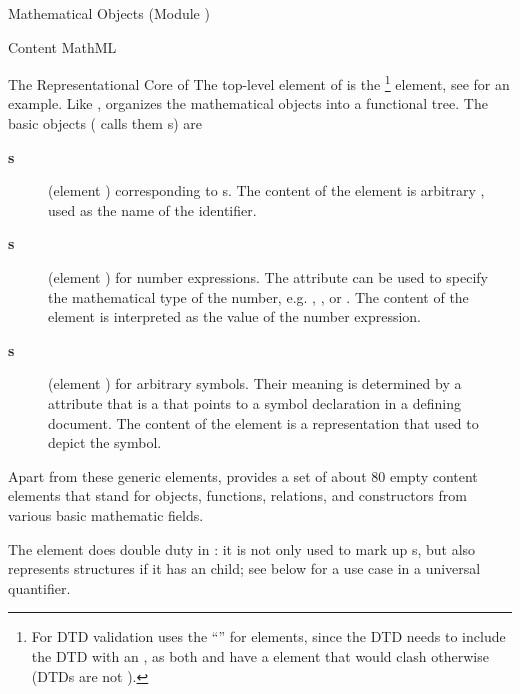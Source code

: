 \begin{tchapter}[id=mobj,short=Mathematical Objects]{Mathematical Objects (Module {})}
\begin{tsection}[id=cmml]{Content MathML}
\begin{tsubsection}[id=mathml-core]{The Representational Core of {\cmathml}}
  The top-level element of {\mathml} is the {}\footnote{For DTD
    validation {\omdoc} uses the {} ``{}'' for
    {\mathml} elements, since the {\omdoc} DTD needs to include the {\mathml} DTD with an
    {}, as both {\mathml} and {\omdoc} have a
    {} element that would clash otherwise (DTDs are not
    {}).} element, see {} for an
  example. Like {\openmath}, {\cmathml} organizes the mathematical objects into a
  functional tree.  The basic objects ({\mathml} calls them {s})
  are
  \begin{description}
  \item[{\bf{}s}] (element {}) corresponding to
    {s}. The content of the {} element is
    arbitrary {\pmathml}, used as the name of the identifier.
  \item[{\bf{}s}] (element {}) for number
    expressions. The attribute {} can be used to specify the
    mathematical type of the number, e.g. {}, {}, or
    {}. The content of the {} element is
    interpreted as the value of the number expression.
  \item[{\bf{}s}] (element {}) for arbitrary
    symbols.  Their meaning is determined by a {} attribute that
    is a {} that points to a symbol declaration in a defining
    document. The content of the {} element is a {\pmathml}
    representation that used to depict the symbol.
  \end{description}
Apart from these generic elements, {\cmathml} provides a set of about 80 empty
content elements that stand for objects, functions, relations, and constructors
from various basic mathematic fields.

The {} element does double duty in {\cmathml}: it is not only used
to mark up {s}, but also represents {} structures
if it has an {} child; see {} below for a
use case in a universal quantifier.


\end{tsubsection}
\end{tsection}
\end{tchapter}
